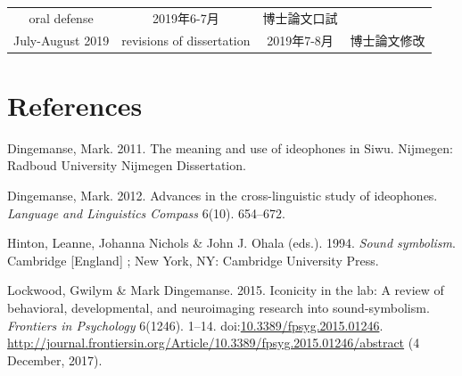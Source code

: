 \documentclass[12pt,]{article}
\theoremstyle{definition}
\theoremstyle{definition}
\theoremstyle{definition}
\theoremstyle{remark}
\begin{document}
\begin{longtable}[]{@{}cccc@{}}
\begin{minipage}[t]{0.26\columnwidth}
oral defense\strut
\end{minipage} & \begin{minipage}[t]{0.18\columnwidth}\centering\strut
2019年6-7月\strut
\end{minipage} & \begin{minipage}[t]{0.24\columnwidth}\centering\strut
博士論文口試\strut
\end{minipage}\tabularnewline
\begin{minipage}[t]{0.20\columnwidth}\centering\strut
July-August 2019\strut
\end{minipage} & \begin{minipage}[t]{0.26\columnwidth}\centering\strut
revisions of dissertation\strut
\end{minipage} & \begin{minipage}[t]{0.18\columnwidth}\centering\strut
2019年7-8月\strut
\end{minipage} & \begin{minipage}[t]{0.24\columnwidth}\centering\strut
博士論文修改\strut
\end{minipage}\tabularnewline
\bottomrule
\end{longtable}

\section*{References}\label{references}

\hypertarget{refs}{}
\hypertarget{ref-Dingemanse2011a}{}
Dingemanse, Mark. 2011. The meaning and use of ideophones in Siwu.
Nijmegen: Radboud University Nijmegen Dissertation.

\hypertarget{ref-Dingemanse2012}{}
Dingemanse, Mark. 2012. Advances in the cross-linguistic study of
ideophones. \emph{Language and Linguistics Compass} 6(10). 654--672.

\hypertarget{ref-Hinton1994}{}
Hinton, Leanne, Johanna Nichols \& John J. Ohala (eds.). 1994.
\emph{Sound symbolism}. Cambridge {[}England{]} ; New York, NY:
Cambridge University Press.

\hypertarget{ref-Lockwood2015a}{}
Lockwood, Gwilym \& Mark Dingemanse. 2015. Iconicity in the lab: A
review of behavioral, developmental, and neuroimaging research into
sound-symbolism. \emph{Frontiers in Psychology} 6(1246). 1--14.
doi:\href{https://doi.org/10.3389/fpsyg.2015.01246}{10.3389/fpsyg.2015.01246}.
\url{http://journal.frontiersin.org/Article/10.3389/fpsyg.2015.01246/abstract}
(4 December, 2017).
\end{document}
